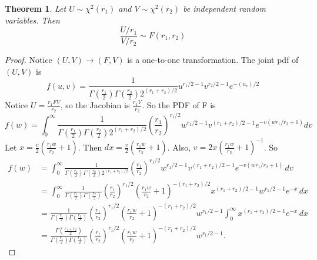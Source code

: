 \documentclass{article}
\newtheorem{theorem}{Theorem}
\theoremstyle{definition}\newtheorem{definition}{DEF}
\theoremstyle{definition}\newtheorem{example}{Ex}
\theoremstyle{lemma}\newtheorem{lemma}{Lemma}
\theoremstyle{corrolary}\newtheorem{corrolary}{Cor}
\begin{document}
\begin{theorem}
Let $U\sim \chi^2(r_1)$ and $V\sim \chi^2(r_2)$ be independent random variables.
Then
\begin{equation}
\frac{U/r_1}{V/r_2}\sim F(r_1, r_2)
\end{equation}
\end{theorem}
\begin{proof}
Notice $(U,V)\rightarrow (F,V)$ is a one-to-one transformation.
The joint pdf of $(U,V)$ is
\begin{equation*}
f(u,v)=\frac{1}{\Gamma\left( \frac{r_1}{2}\right) \Gamma \left(\frac{r_2}{2}\right) 2^{(r_1+r_2)/2}} u^{r_1/2 -1} v^{r_2/2 -1} e^{-(u_v)/2}
\end{equation*}
Notice $U=\frac{r_1 FV}{r_2}$, so the Jacobian is $\frac{r_1 V}{r_2}$.
So the PDF of F is
\begin{equation*}
f(w)= \int_0^\infty \frac{1}{\Gamma\left( \frac{r_1}{2}\right) \Gamma \left(\frac{r_2}{2}\right) 2^{(r_1+r_2)/2}} \left( \frac{r_1}{r_2} \right)^{r_1/2} w^{r_1 /2 - 1} v^{(r_1 +r_2 )/2-1}e^{-v(w r_1 / r_2 +1)}dv
\end{equation*}
Let $x=\frac{v}{2}\left( \frac{r_1 w}{r_2} +1\right)$.
Then $dx=\frac{v}{2}\left( \frac{r_1 w}{r_2} +1\right)$.
Also, $v=2x\left( \frac{r_1 w}{r_2} +1\right)^{-1}$.
So
\begin{align*}
f(w)
&= \int_0^\infty
\frac{1}{
\Gamma\!\left(\frac{r_1}{2}\right)
\Gamma\!\left(\frac{r_2}{2}\right)
2^{(r_1+r_2)/2}
}
\left(\frac{r_1}{r_2}\right)^{r_1/2}
w^{r_1/2 - 1}
v^{(r_1+r_2)/2 - 1}
e^{-v\left(wr_1/r_2 + 1\right)}
\, dv
\\
&= \int_0^\infty
\frac{1}{
\Gamma\!\left(\frac{r_1}{2}\right)
\Gamma\!\left(\frac{r_2}{2}\right)
}
\left(\frac{r_1}{r_2}\right)^{r_1/2}
\left(\frac{r_1 w}{r_2} + 1\right)^{-(r_1+r_2)/2}
x^{(r_1+r_2)/2 - 1}
w^{r_1/2 - 1}
e^{-x}
\, dx
\\
&=
\frac{1}{
\Gamma\!\left(\frac{r_1}{2}\right)
\Gamma\!\left(\frac{r_2}{2}\right)
}
\left(\frac{r_1}{r_2}\right)^{r_1/2}
\left(\frac{r_1 w}{r_2} + 1\right)^{-(r_1+r_2)/2}
w^{r_1/2 - 1}
\int_0^\infty x^{(r_1+r_2)/2 - 1} e^{-x} \, dx
\\
&=
\frac{
\Gamma\!\left(\frac{r_1+r_2}{2}\right)
}{
\Gamma\!\left(\frac{r_1}{2}\right)
\Gamma\!\left(\frac{r_2}{2}\right)
}
\left(\frac{r_1}{r_2}\right)^{r_1/2}
\left(\frac{r_1 w}{r_2} + 1\right)^{-(r_1+r_2)/2}
w^{r_1/2 - 1}.
\end{align*}
\end{proof}
\end{document}
